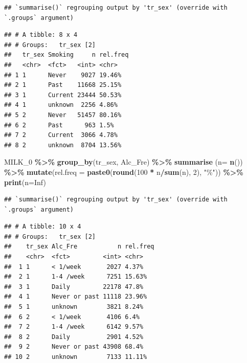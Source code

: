 \documentclass[
]{article}
\newenvironment{Shaded}{\begin{snugshade}}{\end{snugshade}}
\newcommand{\DataTypeTok}[1]{\textcolor[rgb]{0.13,0.29,0.53}{#1}}
\newcommand{\DecValTok}[1]{\textcolor[rgb]{0.00,0.00,0.81}{#1}}
\newcommand{\KeywordTok}[1]{\textcolor[rgb]{0.13,0.29,0.53}{\textbf{#1}}}
\newcommand{\NormalTok}[1]{#1}
\newcommand{\OperatorTok}[1]{\textcolor[rgb]{0.81,0.36,0.00}{\textbf{#1}}}
\newcommand{\OtherTok}[1]{\textcolor[rgb]{0.56,0.35,0.01}{#1}}
\newcommand{\StringTok}[1]{\textcolor[rgb]{0.31,0.60,0.02}{#1}}
\begin{document}
\begin{verbatim}
## `summarise()` regrouping output by 'tr_sex' (override with `.groups` argument)
\end{verbatim}

\begin{verbatim}
## # A tibble: 8 x 4
## # Groups:   tr_sex [2]
##   tr_sex Smoking     n rel.freq
##   <chr>  <fct>   <int> <chr>   
## 1 1      Never    9027 19.46%  
## 2 1      Past    11668 25.15%  
## 3 1      Current 23444 50.53%  
## 4 1      unknown  2256 4.86%   
## 5 2      Never   51457 80.16%  
## 6 2      Past      963 1.5%    
## 7 2      Current  3066 4.78%   
## 8 2      unknown  8704 13.56%
\end{verbatim}

\begin{Shaded}
\begin{Highlighting}[]
\NormalTok{MILK\_}\DecValTok{0} \OperatorTok{\%\textgreater{}\%}\StringTok{ }
\StringTok{  }\KeywordTok{group\_by}\NormalTok{(tr\_sex, Alc\_Fre) }\OperatorTok{\%\textgreater{}\%}\StringTok{ }
\StringTok{  }\KeywordTok{summarise}\NormalTok{ (}\DataTypeTok{n=} \KeywordTok{n}\NormalTok{()) }\OperatorTok{\%\textgreater{}\%}
\StringTok{  }\KeywordTok{mutate}\NormalTok{(}\DataTypeTok{rel.freq =} \KeywordTok{paste0}\NormalTok{(}\KeywordTok{round}\NormalTok{(}\DecValTok{100} \OperatorTok{*}\StringTok{ }\NormalTok{n}\OperatorTok{/}\KeywordTok{sum}\NormalTok{(n), }\DecValTok{2}\NormalTok{), }\StringTok{"\%"}\NormalTok{))  }\OperatorTok{\%\textgreater{}\%}\StringTok{ }
\StringTok{  }\KeywordTok{print}\NormalTok{(}\DataTypeTok{n=}\OtherTok{Inf}\NormalTok{)}
\end{Highlighting}
\end{Shaded}

\begin{verbatim}
## `summarise()` regrouping output by 'tr_sex' (override with `.groups` argument)
\end{verbatim}

\begin{verbatim}
## # A tibble: 10 x 4
## # Groups:   tr_sex [2]
##    tr_sex Alc_Fre           n rel.freq
##    <chr>  <fct>         <int> <chr>   
##  1 1      < 1/week       2027 4.37%   
##  2 1      1-4 /week      7251 15.63%  
##  3 1      Daily         22178 47.8%   
##  4 1      Never or past 11118 23.96%  
##  5 1      unknown        3821 8.24%   
##  6 2      < 1/week       4106 6.4%    
##  7 2      1-4 /week      6142 9.57%   
##  8 2      Daily          2901 4.52%   
##  9 2      Never or past 43908 68.4%   
## 10 2      unknown        7133 11.11%
\end{verbatim}
\end{document}
